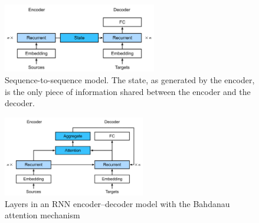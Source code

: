 \begin{table}[H]
    \begin{minipage}{0.49\linewidth}
        \begin{figure}[H]
            \centering
            \includegraphics[width=\linewidth, height=3cm, keepaspectratio]{Pictures/deep_neural_networks/seq2seq-state.jpg}
            \caption*{Sequence-to-sequence model. The state, as generated by the encoder, is the only piece of information shared between the encoder and the decoder.}
        \end{figure}
    \end{minipage}
    \hfill
    \begin{minipage}{0.49\linewidth}
        \begin{figure}[H]
            \centering
            \includegraphics[width=\linewidth, height=3.5cm, keepaspectratio]{Pictures/deep_neural_networks/seq2seq-details-attention.jpg}
            \caption*{Layers in an RNN encoder–decoder model with the Bahdanau attention mechanism}
        \end{figure}
    \end{minipage}
\end{table}

